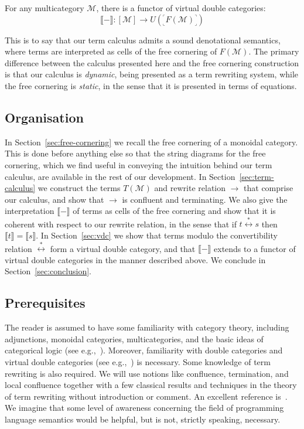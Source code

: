 \documentclass[twoside,11pt,final]{entics}
\newcommand{\corner}[1]{{\text{}^\ulcorner_\llcorner\!{#1}\!_\lrcorner^\urcorner}}
\begin{document}
For any multicategory $\mathcal{M}$, there is a functor of virtual double categories: 
\[
  \llbracket - \rrbracket : [\mathcal{M}] \to U\left(\corner{F(\mathcal{M})}\right)
\]

This is to say that our term calculus admits a sound denotational semantics, where terms are interpreted as cells of the free cornering of $F(\mathcal{M})$. The primary difference between the calculus presented here and the free cornering construction is that our calculus is \emph{dynamic}, being presented as a term rewriting system, while the free cornering is \emph{static}, in the sense that it is presented in terms of equations.

\subsection{Organisation}
In Section~\ref{sec:free-cornering} we recall the free cornering of a monoidal category. This is done before anything else so that the string diagrams for the free cornering, which we find useful in conveying the intuition behind our term calculus, are available in the rest of our development. In Section~\ref{sec:term-calculus} we construct the terms $T(\mathcal{M})$ and rewrite relation $\to$ that comprise our calculus, and show that $\to$ is confluent and terminating. We also give the interpretation $\llbracket - \rrbracket$ of terms as cells of the free cornering and show that it is coherent with respect to our rewrite relation, in the sense that if $t \stackrel{*}{\leftrightarrow} s$ then $\llbracket t \rrbracket = \llbracket s \rrbracket$. In Section~\ref{sec:vdc} we show that terms modulo the convertibility relation $\stackrel{*}{\leftrightarrow}$ form a virtual double category, and that $\llbracket - \rrbracket$ extends to a functor of virtual double categories in the manner described above. We conclude in Section~\ref{sec:conclusion}. 

\subsection{Prerequisites}
The reader is assumed to have some familiarity with category theory, including adjunctions, monoidal categories, multicategories, and the basic ideas of categorical logic (see e.g.,~\cite{MacLane1971,Lambek1986,Shulman2016}). Moreover, familiarity with double categories and virtual double categories (see e.g.,~\cite{Leinster2004,Crutwell2010}) is necessary. Some knowledge of term rewriting is also required. We will use notions like confluence, termination, and local confluence together with a few classical results and techniques in the theory of term rewriting without introduction or comment. An excellent reference is~\cite{Baader1998}. We imagine that some level of awareness concerning the field of programming language semantics would be helpful, but is not, strictly speaking, necessary.
\end{document}
